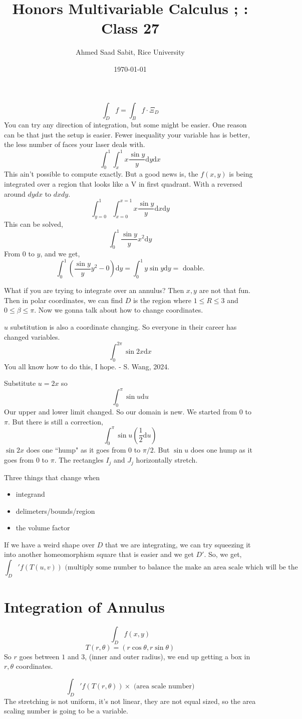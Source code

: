 \documentclass[letter]{article}
\title{Honors Multivariable Calculus ; : Class 27}
\author{Ahmed Saad Sabit, Rice University}
\date{\today}
\begin{document}
\maketitle
\[
\int_D f = \int_B f \cdot \Xi_D
\]
You can try any direction of integration, but some might be easier. One reason can be that just the setup is easier. Fewer inequality your variable has is better, the less number of faces your laser deals with. 
\[
\int_0^{1} \int_x^{1} x \frac{\sin y}{y} \mathrm{d} y \mathrm{d} x
\] 
This ain't possible to compute exactly. But a good news is, the $f(x,y)$ is being integrated over a region that looks like a V in first quadrant. With a reversed around $dy dx$ to $dx dy$. 
\[
	\int_{y=0}^{1} \int_{x=0}^{x=1} x \frac{\sin y}{y} \mathrm{d}  x \mathrm{d}  y
\]
This can be solved, 
\[
\int_0^{1} \frac{\sin y}{y} x^2 \mathrm{d} y 
\]
From $0$ to $y$, and we get, 
\[
\int_0^{1} \left(
\frac{\sin y}{y} y^2 - 0 
\right) \mathrm{d}  y = 
\int_0 ^{1} y \sin y \mathrm{d}  y = \text{ doable.}
\] 

What if you are trying to integrate over an annulus? Then $x,y$ are not that fun. Then in polar coordinates, we can find $D$ is the region where $1 \le R \le 3$ and $0 \le  \beta \le  \pi $. Now we gonna talk about how to change coordinates.

$u$ substitution is also a coordinate changing. So everyone in their career has changed variables. 
\[
\int_0^{2\pi } \sin 2x \mathrm{d}  x
\]
You all know how to do this, I hope. - S. Wang, 2024. 

Substitute $u = 2x$ so
\[
\int_0^{\pi } \sin u \mathrm{d} u
\]
Our upper and lower limit changed. So our domain is new. We started from $0$ to $\pi $. But there is still a correction, 
\[
\int_0^{\pi } \sin u \left(\frac{1}{2 } \mathrm{d}  u\right)
\]
$\sin 2x $ does one ``hump" as it goes from $0$ to $\pi / 2$. But $\sin u$ does one hump as it goes from $0$ to $\pi$. The rectangles $I_j$ and $J_j$ horizontally stretch. 

Three things that change when 
\begin{itemize}
	\item integrand
	\item delimeters/bounds/region
	\item the volume factor
\end{itemize}

If we have a weird shape over $D$ that we are integrating, we can try squeezing it into another homeomorphism square that is easier and we get $D'$. So, we get, 
\[
\int_D' f(T(u, v))  \text{ (multiply some number to balance the make an area scale which will be the determinant. )}
\]

\section*{Integration of Annulus} 
\[
\int_D f(x,y)
\]
\[
T(r,\theta) = (r \cos \theta, r \sin \theta)
\] 
So $r$ goes between $1$ and $3$, (inner and outer radius), we end up getting a box in $r, \theta$ coordinates. 

\[
\int_D' f(T(r, \theta)) \times  \text{ (area scale number)} 
\]
The stretching is not uniform, it's not linear, they are not equal sized, so the area scaling number is going to be a variable. 
\end{document}
